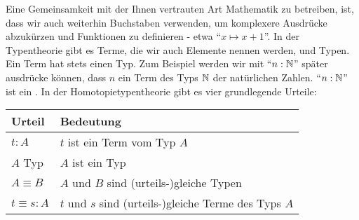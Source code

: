 Eine Gemeinsamkeit mit der Ihnen vertrauten Art Mathematik zu betreiben, ist, dass wir auch weiterhin Buchstaben verwenden, um komplexere Ausdrücke abzukürzen und Funktionen zu definieren - etwa ``$x\mapsto x+1$''. In der Typentheorie gibt es Terme, die wir auch Elemente nennen werden, und Typen. Ein Term hat stets einen Typ. Zum Beispiel werden wir mit ``$n:\mathbb{N}$'' später ausdrücke können, dass $n$ ein Term des Typs $\mathbb{N}$ der natürlichen Zahlen. ``$n:\mathbb{N}$'' ist ein .
In der Homotopietypentheorie gibt es vier grundlegende Urteile:

\begin{center}
  \begin{tabular}{ll}
    Urteil                        & Bedeutung \\
    \hline
    $ t : A$         & $t$ ist ein Term vom Typ $A$ \\
    $ A$ Typ         & $A$ ist ein Typ \\
    $ A\equiv B$     & $A$ und $B$ sind (urteils-)gleiche Typen \\
    $ t\equiv s : A$ & $t$ und $s$ sind (urteils-)gleiche Terme des Typs $A$ \\
  \end{tabular}
  \label{tab:urteile}
\end{center}


